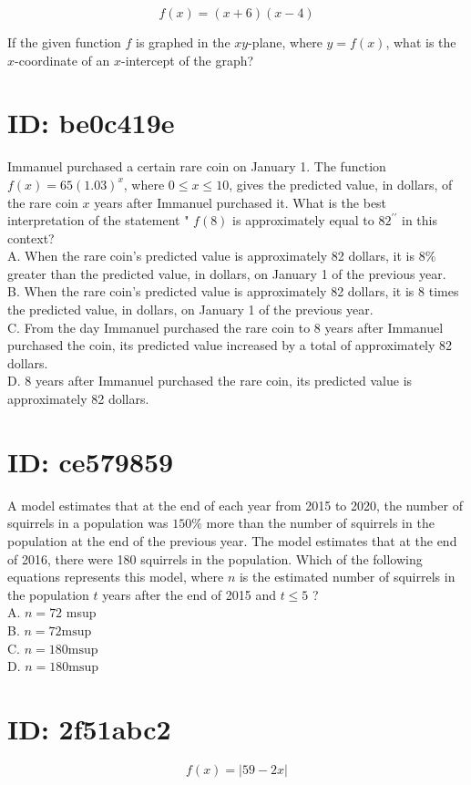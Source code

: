 $$
f(x)=(x+6)(x-4)
$$

If the given function $f$ is graphed in the $x y$-plane, where $y=f(x)$, what is the $x$-coordinate of an $x$-intercept of the graph?

\section*{ID: be0c419e}
Immanuel purchased a certain rare coin on January 1. The function $f(x)=65(1.03)^{x}$, where $0 \leq x \leq 10$, gives the predicted value, in dollars, of the rare coin $x$ years after Immanuel purchased it. What is the best interpretation of the statement " $f(8)$ is approximately equal to $82^{\prime \prime}$ in this context?\\
A. When the rare coin's predicted value is approximately 82 dollars, it is $8 \%$ greater than the predicted value, in dollars, on January 1 of the previous year.\\
B. When the rare coin's predicted value is approximately 82 dollars, it is 8 times the predicted value, in dollars, on January 1 of the previous year.\\
C. From the day Immanuel purchased the rare coin to 8 years after Immanuel purchased the coin, its predicted value increased by a total of approximately 82 dollars.\\
D. 8 years after Immanuel purchased the rare coin, its predicted value is approximately 82 dollars.

\section*{ID: ce579859}
A model estimates that at the end of each year from 2015 to 2020, the number of squirrels in a population was $150 \%$ more than the number of squirrels in the population at the end of the previous year. The model estimates that at the end of 2016, there were 180 squirrels in the population. Which of the following equations represents this model, where $n$ is the estimated number of squirrels in the population $t$ years after the end of 2015 and $t \leq 5$ ?\\
A. $n=72$ msup\\
B. $n=72 \mathrm{msup}$\\
C. $n=180 \mathrm{msup}$\\
D. $n=180 \mathrm{msup}$

\section*{ID: 2f51abc2}
$$
f(x)=|59-2 x|
$$

